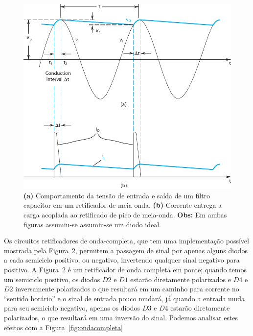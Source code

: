 \documentclass[12pt,a4paper]{article}
\begin{document}
\begin{figure}[htpb]
  \centering
  \includegraphics[width=0.7\linewidth]{./retificadorpico.pdf}
  \caption{ \textbf{(a)} Comportamento da tensão de entrada e saída de um filtro capacitor em um retificador de meia onda. \textbf{(b)} Corrente entrega a carga acoplada ao retificado de pico de meia-onda. \textbf{Obs:} Em ambas figuras assumiu-se assumiu-se um diodo ideal.}
  \label{fig:retificadorpico}
\end{figure}

Os circuitos retificadores de onda-completa, que tem uma implementação possível mostrada pela Figura~2, permitem a passagem de sinal por apenas alguns diodos a cada semiciclo positivo, ou negativo, invertendo qualquer sinal negativo para positivo. A Figura~2 é um retificador de onda completa em ponte; quando temos um semiciclo positivo, os diodos $D2$ e $D1$ estarão diretamente polarizados e $D4$ e $D2$ inversamente polarizados o que resultará em um caminho para corrente no ``sentido horário'' e o sinal de entrada pouco mudará, já quando a entrada muda para seu semiciclo negativo, apenas os diodos $D3$ e $D4$ estarão diretamente polarizados, o que resultará em uma inversão do sinal. Podemos analisar estes efeitos com a Figura~\ref{fig:ondacompleta} 
\end{document}
